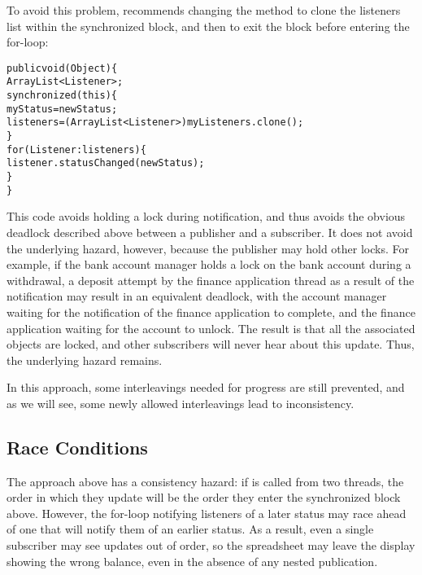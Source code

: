 \documentclass{llncs}
\begin{document}
To avoid this problem, \cite{Englander:beans} recommends changing the
 method to clone the listeners list within the
synchronized block, and then to exit the block before entering the
for-loop:
%
\begin{alltt}
    public void (Object ) \{
        ArrayList<Listener> ;
        synchronized (this) \{
            myStatus = newStatus;
            listeners = (ArrayList<Listener>) myListeners.clone();
        \}
        for (Listener : listeners) \{
            listener.statusChanged(newStatus);
        \}
    \}
\end{alltt}
%
This code avoids holding a lock during notification, and thus avoids
the obvious deadlock described above between a publisher and a
subscriber.  It does not avoid the underlying hazard, however, because
the publisher may hold other locks.  For example, if the bank account
manager holds a lock on the bank account during a withdrawal, a
deposit attempt by the finance application thread as a result of the
notification may result in an equivalent deadlock, with the account
manager waiting for the notification of the finance application to
complete, and the finance application waiting for the account to
unlock.  The result is that all the associated objects are locked, and
other subscribers will never hear about this update.  Thus, the
underlying hazard remains.

In this approach, some interleavings needed for progress are still
prevented, and as we will see, some newly allowed interleavings lead
to inconsistency.

\subsection{Race Conditions} 

The approach above has a consistency hazard: if  is
called from two threads, the order in which they update 
will be the order they enter the synchronized block above. However,
the for-loop notifying listeners of a later status may race ahead of
one that will notify them of an earlier status. As a result, even a
single subscriber may see updates out of order, so the spreadsheet may
leave the display showing the wrong balance, even in the absence of
any nested publication.
\end{document}
